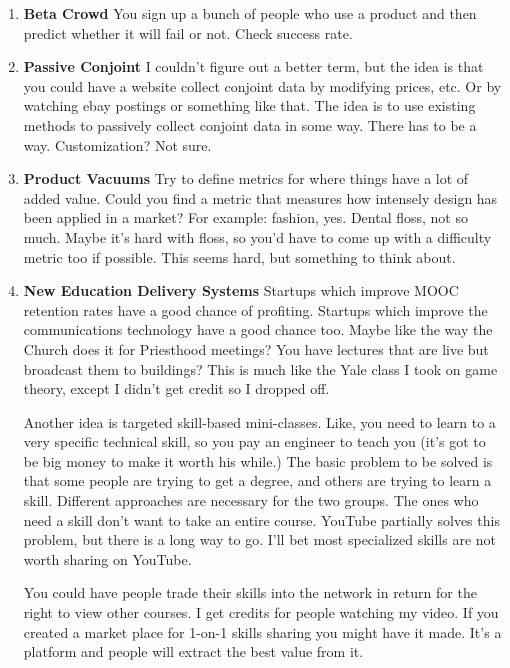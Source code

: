\documentclass[paper=a4, fontsize=11pt]{scrartcl} %
\numberwithin{equation}{section} %
\numberwithin{figure}{section} %
\numberwithin{table}{section} %
\begin{document}
\begin{enumerate}
\item \textbf{Beta Crowd} You sign up a bunch of people who use a product and then predict whether it will fail or not.  Check success rate.

\item \textbf{Passive Conjoint} I couldn't figure out a better term, but the idea is that you could have a website collect conjoint data by modifying prices, etc.  Or by watching ebay postings or something like that.  The idea is to use existing methods to passively collect conjoint data in some way.  There has to be a way.  Customization?  Not sure.

\item \textbf{Product Vacuums}  Try to define metrics for where things have a lot of added value.  Could you find a metric that measures how intensely design has been applied in a market?  For example: fashion, yes.  Dental floss, not so much.  Maybe it's hard with floss, so you'd have to come up with a difficulty metric too if possible.  This seems hard, but something to think about.

\item \textbf{New Education Delivery Systems}  Startups which improve MOOC retention rates have a good chance of profiting.  Startups which improve the communications technology have a good chance too.  Maybe like the way the Church does it for Priesthood meetings?  You have lectures that are live but broadcast them to buildings?  This is much like the Yale class I took on game theory, except I didn't get credit so I dropped off.  

Another idea is targeted skill-based mini-classes.  Like, you need to learn to a very specific technical skill, so you pay an engineer to teach you (it's got to be big money to make it worth his while.)  The basic problem to be solved is that some people are trying to get a degree, and others are trying to learn a skill.  Different approaches are necessary for the two groups.  The ones who need a skill don't want to take an entire course.  YouTube partially solves this problem, but there is a long way to go.  I'll bet most specialized skills are not worth sharing on YouTube.

You could have people trade their skills into the network in return for the right to view other courses.  I get credits for people watching my video.  If you created a market place for 1-on-1 skills sharing you might have it made.  It's a platform and people will extract the best value from it.


\end{enumerate}
\end{document}
